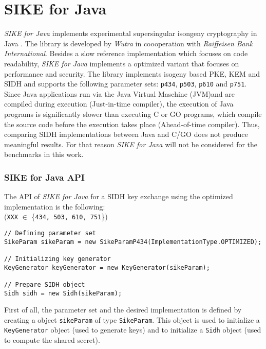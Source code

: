 \section{SIKE for Java}
\textit{SIKE for Java} implements experimental supersingular isongeny cryptography in Java \parencite{SikeForJava2020github}. The library is developed by \textit{Wutra} in coooperation with \textit{Raiffeisen Bank International}. Besides a slow reference implementation which focuses on code readability, \textit{SIKE for Java} implements a optimized variant that focuses on performance and security. The library implements isogeny based \gls{PKE}, \gls{KEM} and \gls{SIDH} and supports the following parameter sets: \texttt{p434}, \texttt{p503}, \texttt{p610} and \texttt{p751}.\\
Since Java applications run via the Java Virtual Maschine (\gls{JVM})and are compiled during execution (Just-in-time compiler), the execution of Java programs is significantly slower than  executing C or GO programs, which compile the source code before the execution takes place (Ahead-of-time compiler). Thus, comparing SIDH implementations between Java and C/GO does not produce meaningful results. For that reason \textit{SIKE for Java} will not be considered for the benchmarks in this work.

\subsubsection{SIKE for Java API}

The API of \textit{SIKE for Java} for a \gls{SIDH} key exchange using the optimized implementation is the following:\\
(\texttt{XXX} $\in$ \{\texttt{434, 503, 610, 751}\})


\begin{lstlisting}[]
// Defining parameter set
SikeParam sikeParam = new SikeParamP434(ImplementationType.OPTIMIZED);

// Initializing key generator
KeyGenerator keyGenerator = new KeyGenerator(sikeParam);

// Prepare SIDH object
Sidh sidh = new Sidh(sikeParam);
\end{lstlisting}
First of all, the parameter set and the desired implementation is defined by creating a object \texttt{sikeParam} of type \texttt{SikeParam}. This object is used to initialize a \texttt{KeyGenerator} object (used to generate keys) and to initialize a \texttt{Sidh} object (used to compute the shared secret).\\

